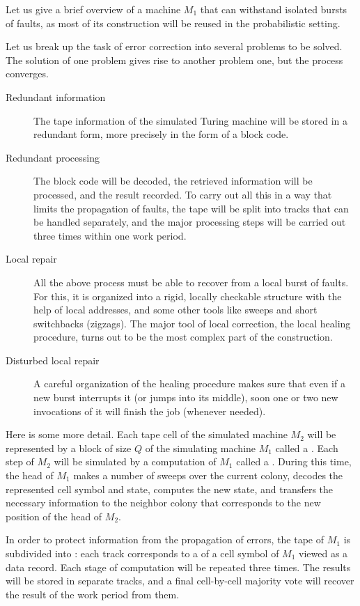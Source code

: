 \documentclass[12pt]{memoir}
\begin{document}
Let us give a brief overview of a machine \( M_1 \) that
can withstand isolated bursts of faults, as most of its construction will be reused
in the probabilistic setting.

Let us break up the task of error correction into several 
problems to be solved.
The solution of one problem gives rise to another problem one, 
but the process converges.
\begin{description}
\item[Redundant information] The tape information of the simulated Turing machine
will be stored in a redundant form, more precisely in the form of a block code.
\item[Redundant processing] The block code will be decoded, the retrieved information 
will be processed, and the result recorded.
To carry out all this in a way that limits the propagation of faults, the tape will be split
into tracks that can be handled separately, and the major processing steps will be 
carried out three times within one work period.
\item[Local repair] All the above process must be able to recover from a local burst of faults.
For this, it is organized into a rigid, locally checkable structure
with the help of local addresses, and some other tools like sweeps and 
short switchbacks (zigzags).
The major tool of local correction, the local healing procedure, turns out to be the most
complex part of the construction.
\item[Disturbed local repair] A careful organization of the healing procedure
makes sure that even if a new burst interrupts it (or jumps into its middle),
soon one or two new invocations of it will finish the job (whenever needed).
\end{description}

Here is some more detail.
Each tape cell of the simulated machine \( M_{2} \) will be represented by a block of
size \( Q \) of the simulating machine \( M_{1} \) called a .
Each step of \( M_{2} \) will be simulated by a computation of \( M_{1} \) called
a .
During this time, the head of \( M_{1} \) makes a number of sweeps over the
current colony, decodes the represented cell symbol and state,
computes the new state, and transfers the necessary information to the 
neighbor colony that corresponds to the new position of the head of \( M_{2} \).

In order to protect information from the propagation of errors,
the tape of \( M_{1} \) is subdivided into : each track corresponds to a 
 of a cell symbol of \( M_{1} \) viewed as a data record.
Each stage of computation will be repeated three times.
The results will be stored in separate tracks, and a final cell-by-cell majority vote
will recover the result of the work period from them.
\end{document}

